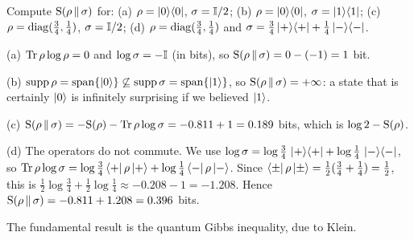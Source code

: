 \begin{example}\label{ex:qre}
  Compute $\Srel\rho\sigma$ for: (a) $\rho=\ket0\!\bra0$, $\sigma=\Id/2$; (b) $\rho=\ket0\!\bra0$, $\sigma=\ket1\!\bra1$; (c) $\rho=\diag(\tfrac34,\tfrac14)$, $\sigma=\Id/2$; (d) $\rho=\diag(\tfrac34,\tfrac14)$ and $\sigma=\tfrac34\ket+\!\bra++\tfrac14\ket-\!\bra-$.
\end{example}
\begin{solution}
  \begin{steps}
    \item (a) $\Tr\rho\log\rho=0$ and $\log\sigma=-\Id$ (in bits), so $\Srel\rho\sigma=0-(-1)=1$ bit.
    \item (b) $\supp\rho=\Span\{\ket0\}\not\subseteq\supp\sigma=\Span\{\ket1\}$, so $\Srel\rho\sigma=+\infty$: a state that is certainly $\ket0$ is infinitely surprising if we believed $\ket1$.
    \item (c) $\Srel\rho\sigma=-\Ss(\rho)-\Tr\rho\log\sigma=-0.811+1=0.189$ bits, which is $\log2-\Ss(\rho)$.
    \item (d) The operators do not commute. We use $\log\sigma=\log\tfrac34\,\ket+\!\bra++\log\tfrac14\,\ket-\!\bra-$, so $\Tr\rho\log\sigma=\log\tfrac34\bra+\rho\ket++\log\tfrac14\bra-\rho\ket-$. Since $\bra\pm\rho\ket\pm=\tfrac12(\tfrac34+\tfrac14)=\tfrac12$, this is $\tfrac12\log\tfrac34+\tfrac12\log\tfrac14\approx-0.208-1=-1.208$. Hence $\Srel\rho\sigma=-0.811+1.208=0.396$ bits.
  \end{steps}
\end{solution}

The fundamental result is the quantum Gibbs inequality, due to Klein.

